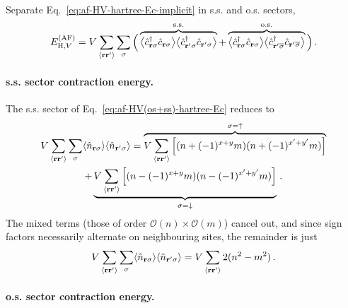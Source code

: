 \begin{tabproof}
	
	Separate Eq.~\eqref{eq:af-HV-hartree-Ec-implicit} in s.s. and o.s. sectors,
	\begin{equation}\label{eq:af-HV(os+ss)-hartree-Ec}
		E_{\mathrm{H},V}^{(\mathrm{AF})} = V \sum_{\ev{\mathbf{r}\mathbf{r}'}} \sum_{\sigma} \Big(
		\overbrace{
			\big\langle \hat c_{\mathbf{r}\sigma}^\dagger \hat c_{\mathbf{r}\sigma} \big\rangle  \big\langle \hat c_{\mathbf{r}'\sigma}^\dagger \hat c_{\mathbf{r}'\sigma} \big\rangle
		}^\mathrm{s.s.} + \overbrace{
			\big\langle \hat c_{\mathbf{r}\sigma}^\dagger \hat c_{\mathbf{r}\sigma} \big\rangle  \big\langle \hat c_{\mathbf{r}'\overline{\sigma}}^\dagger \hat c_{\mathbf{r}'\overline{\sigma}} \big\rangle
		}^\mathrm{o.s.}
		\Big) \, .
	\end{equation}
	
	\paragraph{s.s. sector contraction energy.}
	
	The s.s. sector of Eq.~\eqref{eq:af-HV(os+ss)-hartree-Ec} reduces to
	\begin{multline*}
		V \sum_{\ev{\mathbf{r}\mathbf{r}'}} \sum_\sigma \langle
		\hat n_{\mathbf{r}\sigma}
		\rangle \langle
		\hat n_{\mathbf{r}'\sigma}
		\rangle = \overbrace{
			V \sum_{\ev{\mathbf{r}\mathbf{r}'}} \left[
			(
			n + (-1)^{x+y} m
			) (
			n + (-1)^{x'+y'} m
			)
			\right]
		}^{\sigma=\uparrow} \\
		+ \underbrace{
			V \sum_{\ev{\mathbf{r}\mathbf{r}'}} \left[
			(
			n - (-1)^{x+y} m
			) (
			n - (-1)^{x'+y'} m
			)
			\right]
		}_{\sigma=\downarrow} \, .
	\end{multline*}
	The mixed terms (those of order $\mathcal{O}(n)\times\mathcal{O}(m)$) cancel out, and since sign factors necessarily alternate on neighbouring sites, the remainder is just
	\begin{equation}\label{eq:af-HV(ss)-hartree-Ec}
		V \sum_{\ev{\mathbf{r}\mathbf{r}'}} \sum_\sigma \langle
		\hat n_{\mathbf{r}\sigma}
		\rangle \langle
		\hat n_{\mathbf{r}'\sigma}
		\rangle = V \sum_{\ev{\mathbf{r}\mathbf{r}'}} 2(
		n^2-m^2
		) \, .
	\end{equation}
	
	\paragraph{o.s. sector contraction energy.}
	

\end{tabproof}
